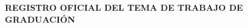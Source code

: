\begin{minipage}{.1\textwidth} %
  \raggedright
\end{minipage}
\hfill
\begin{minipage}{.9\textwidth} %
  \raggedleft
  \centering
  {\bfseries
    \Universidad \\
    \Facultad \\
    REGISTRO OFICIAL DEL TEMA DE TRABAJO DE GRADUACIÓN
  }
\end{minipage}
